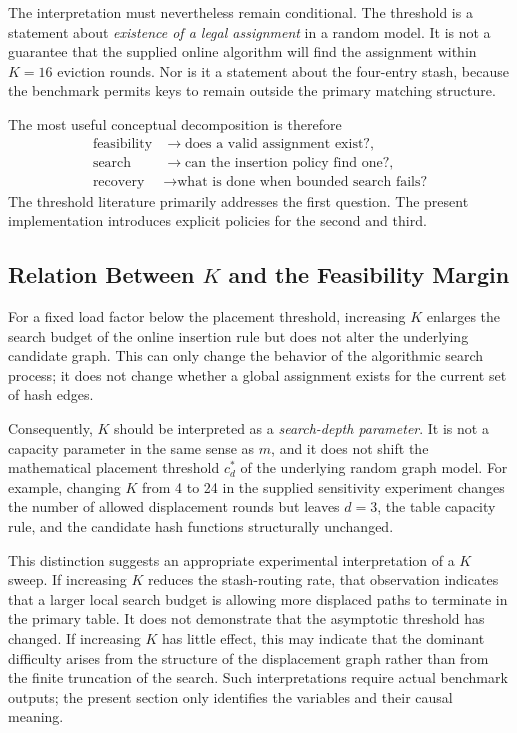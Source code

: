 \documentclass[conference]{IEEEtran}
\begin{document}
The interpretation must nevertheless remain conditional. The threshold is a statement about \emph{existence of a legal assignment} in a random model. It is not a guarantee that the supplied online algorithm will find the assignment within $K=16$ eviction rounds. Nor is it a statement about the four-entry stash, because the benchmark permits keys to remain outside the primary matching structure.

The most useful conceptual decomposition is therefore
\begin{align}
    \text{feasibility} &\rightarrow \text{does a valid assignment exist?},\\
    \text{search} &\rightarrow \text{can the insertion policy find one?},\\
    \text{recovery} &\rightarrow \text{what is done when bounded search fails?}
\end{align}
The threshold literature primarily addresses the first question. The present implementation introduces explicit policies for the second and third.

\subsection{Relation Between $K$ and the Feasibility Margin}

For a fixed load factor below the placement threshold, increasing $K$ enlarges the search budget of the online insertion rule but does not alter the underlying candidate graph. This can only change the behavior of the algorithmic search process; it does not change whether a global assignment exists for the current set of hash edges.

Consequently, $K$ should be interpreted as a \emph{search-depth parameter}. It is not a capacity parameter in the same sense as $m$, and it does not shift the mathematical placement threshold $c_d^*$ of the underlying random graph model. For example, changing $K$ from 4 to 24 in the supplied sensitivity experiment changes the number of allowed displacement rounds but leaves $d=3$, the table capacity rule, and the candidate hash functions structurally unchanged.

This distinction suggests an appropriate experimental interpretation of a $K$ sweep. If increasing $K$ reduces the stash-routing rate, that observation indicates that a larger local search budget is allowing more displaced paths to terminate in the primary table. It does not demonstrate that the asymptotic threshold has changed. If increasing $K$ has little effect, this may indicate that the dominant difficulty arises from the structure of the displacement graph rather than from the finite truncation of the search. Such interpretations require actual benchmark outputs; the present section only identifies the variables and their causal meaning.
\end{document}
